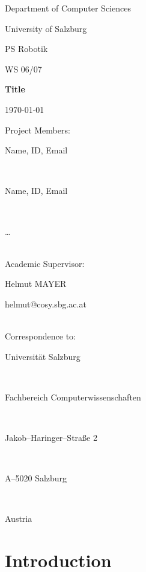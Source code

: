 \documentclass[12pt,fleqn,a4paper]{article}
\begin{document}
\begin{titlepage}%
\vspace{2cm}
\centerline{
\large{Department of Computer Sciences}}
\vspace{0.2cm}
\centerline{\large{University of Salzburg}}%
\vspace{2cm}

\centerline{\large{PS Robotik}}
\centerline{WS 06/07}
\vspace{1cm}

\centerline{\Large{\bf{Title}} }%
\vspace{1cm}

\vspace{0.4cm}%
\centerline{\today}
\vspace{5cm}%

\vspace{0.2cm}
Project Members:\\
\centerline{Name, ID, Email}\\
\centerline{Name, ID, Email}\\
\centerline{\ldots}
\vspace {1cm}\\

Academic Supervisor: \\
\centerline{Helmut MAYER}
\centerline{helmut@cosy.sbg.ac.at}
\vspace{1.5cm}\\
Correspondence to: \\
\centerline{Universit\"{a}t Salzburg} \\
\centerline{Fachbereich Computerwissenschaften} \\
\centerline{Jakob--Haringer--Stra\ss e 2} \\
\centerline{A--5020 Salzburg} \\
\centerline{Austria}
\clearpage
\end{titlepage}


\clearpage
\pagestyle{headings}
\setcounter{page}{1}
\setcounter{page}{1}


\section{Introduction}
\end{document}
